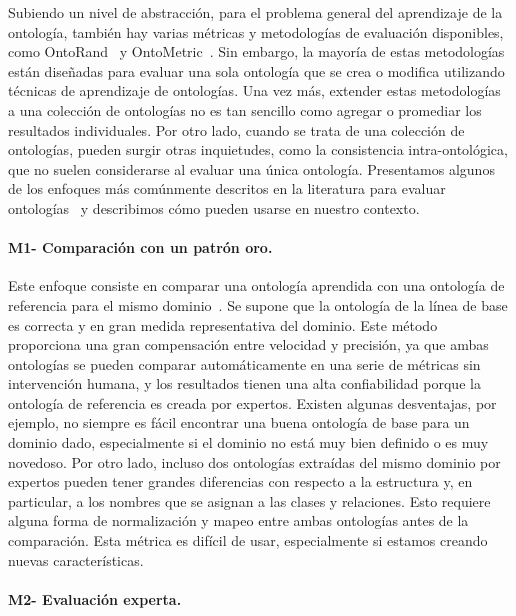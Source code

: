 Subiendo un nivel de abstracción, para el problema general del aprendizaje de la ontología, también hay varias métricas y metodologías de evaluación disponibles, como OntoRand~\cite{ontorand} y OntoMetric~\cite{ontometric}.
Sin embargo, la mayoría de estas metodologías están diseñadas para evaluar una sola ontología que se crea o modifica utilizando técnicas de aprendizaje de ontologías.
Una vez más, extender estas metodologías a una colección de ontologías no es tan sencillo como agregar o promediar los resultados individuales.
Por otro lado, cuando se trata de una colección de ontologías, pueden surgir otras inquietudes, como la consistencia intra-ontológica, que no suelen considerarse al evaluar una única ontología.
Presentamos algunos de los enfoques más comúnmente descritos en la literatura para evaluar ontologías~\cite{petasis2011ontology} y describimos cómo pueden usarse en nuestro contexto.

\paragraph{M1- Comparación con un patrón oro.}

Este enfoque consiste en comparar una ontología aprendida con una ontología de referencia para el mismo dominio~\cite{corcoglioniti2016frame}.
Se supone que la ontología de la línea de base es correcta y en gran medida representativa del dominio.
Este método proporciona una gran compensación entre velocidad y precisión, ya que ambas ontologías se pueden comparar automáticamente en una serie de métricas sin intervención humana, y los resultados tienen una alta confiabilidad porque la ontología de referencia es creada por expertos.
Existen algunas desventajas, por ejemplo, no siempre es fácil encontrar una buena ontología de base para un dominio dado, especialmente si el dominio no está muy bien definido o es muy novedoso.
Por otro lado, incluso dos ontologías extraídas del mismo dominio por expertos pueden tener grandes diferencias con respecto a la estructura y, en particular, a los nombres que se asignan a las clases y relaciones.
Esto requiere alguna forma de normalización y mapeo entre ambas ontologías antes de la comparación.
Esta métrica es difícil de usar, especialmente si estamos creando nuevas características.

\paragraph{M2- Evaluación experta.}

